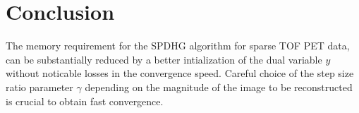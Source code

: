 \documentclass[11pt,twocolumn,twoside]{article}
\begin{document}
\section{Conclusion}

The memory requirement for the SPDHG algorithm for sparse TOF PET data, can be
substantially reduced by a better intialization of the dual variable $y$ without
noticable losses in the convergence speed.
Careful choice of the step size ratio parameter $\gamma$ depending on the magnitude
of the image to be reconstructed is crucial to obtain fast convergence.

\printbibliography
\end{document}
